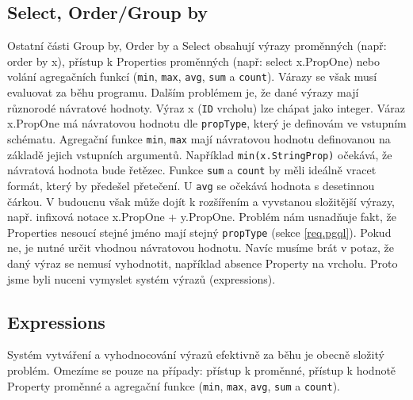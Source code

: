 \subsection{Select, Order/Group by}

Ostatní části Group by, Order by a Select obsahují výrazy proměnných (např: order by x), přístup k Properties proměnných (např: select x.PropOne) nebo volání agregačních funkcí (\verb+min+, \verb+max+, \verb+avg+, \verb+sum+ a \verb+count+).
Várazy se však musí evaluovat za běhu programu.
Dalším problémem je, že dané výrazy mají různorodé návratové hodnoty.
Výraz x (\verb+ID+ vrcholu) lze chápat jako integer.
Váraz x.PropOne má návratovou hodnotu dle \verb+propType+, který je definovám ve vstupním schématu.
Agregační funkce \verb+min+, \verb+max+ mají návratovou hodnotu definovanou na základě jejich vstupních argumentů.
Například \verb+min(x.StringProp)+ očekává, že návratová hodnota bude řetězec.
Funkce \verb+sum+ a \verb+count+ by měli ideálně vracet formát, který by předešel přetečení.
U \verb+avg+ se očekává hodnota s desetinnou čárkou.  
V budoucnu však může dojít k rozšířením a vyvstanou složitější výrazy, např. infixová notace x.PropOne + y.PropOne.
Problém nám usnadňuje fakt, že Properties nesoucí stejné jméno mají stejný \verb+propType+ (sekce \ref{req.pgql}).
Pokud ne, je nutné určit vhodnou návratovou hodnotu.
Navíc musíme brát v potaz, že daný výraz se nemusí vyhodnotit, například absence Property na vrcholu.
Proto jsme byli nuceni vymyslet systém výrazů (expressions).

\subsection{Expressions}

Systém vytváření a vyhodnocování výrazů efektivně za běhu je obecně složitý problém.
Omezíme se pouze na případy: přístup k proměnné, přístup k hodnotě Property proměnné a agregační funkce (\verb+min+, \verb+max+, \verb+avg+, \verb+sum+ a \verb+count+).

